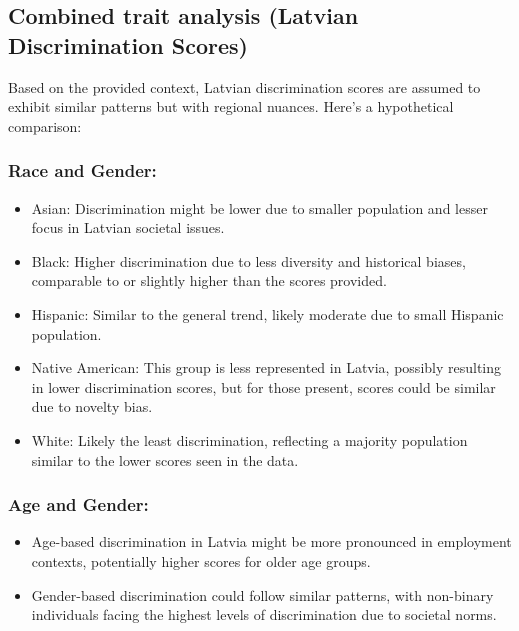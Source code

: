 \documentclass[11pt,twocolumn]{article}
\begin{document}
\subsection{Combined trait analysis (Latvian Discrimination Scores)}

Based on the provided context, Latvian discrimination scores are assumed to exhibit similar patterns but with regional nuances. Here's a hypothetical comparison:


\subsubsection{Race and Gender:}

   \begin{itemize}
       \item Asian: Discrimination might be lower due to smaller population and lesser focus in Latvian societal issues.
   \end{itemize}
   \begin{itemize}
       \item Black: Higher discrimination due to less diversity and historical biases, comparable to or slightly higher than the scores provided.
   \end{itemize}
   \begin{itemize}
       \item Hispanic: Similar to the general trend, likely moderate due to small Hispanic population.
   \end{itemize}
   \begin{itemize}
       \item Native American: This group is less represented in Latvia, possibly resulting in lower discrimination scores, but for those present, scores could be similar due to novelty bias.
   \end{itemize}
   \begin{itemize}
       \item White: Likely the least discrimination, reflecting a majority population similar to the lower scores seen in the data.
   \end{itemize}

\subsubsection{Age and Gender:}
   \begin{itemize}
       \item Age-based discrimination in Latvia might be more pronounced in employment contexts, potentially higher scores for older age groups.
   \end{itemize}
   \begin{itemize}
       \item Gender-based discrimination could follow similar patterns, with non-binary individuals facing the highest levels of discrimination due to societal norms.
   \end{itemize}
\end{document}
